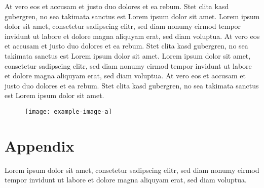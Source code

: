 \documentclass[a4paper,11pt,oneside]{book}
\begin{document}
At vero eos et accusam et justo duo dolores et ea rebum. Stet clita kasd gubergren, no sea takimata sanctus est Lorem ipsum dolor sit amet. Lorem ipsum dolor sit amet, consetetur sadipscing elitr, sed diam nonumy eirmod tempor invidunt ut labore et dolore magna aliquyam erat, sed diam voluptua. At vero eos et accusam et justo duo dolores et ea rebum. Stet clita kasd gubergren, no sea takimata sanctus est Lorem ipsum dolor sit amet. Lorem ipsum dolor sit amet, consetetur sadipscing elitr, sed diam nonumy eirmod tempor invidunt ut labore et dolore magna aliquyam erat, sed diam voluptua. At vero eos et accusam et justo duo dolores et ea rebum. Stet clita kasd gubergren, no sea takimata sanctus est Lorem ipsum dolor sit amet.

\begin{figure}
    \centering
    \texttt{[image: example-image-a]}
\end{figure}




\appendix
\chapter{Appendix}
Lorem ipsum dolor sit amet, consetetur sadipscing elitr, sed diam nonumy eirmod tempor invidunt ut labore et dolore magna aliquyam erat, sed diam voluptua. 
\end{document}
